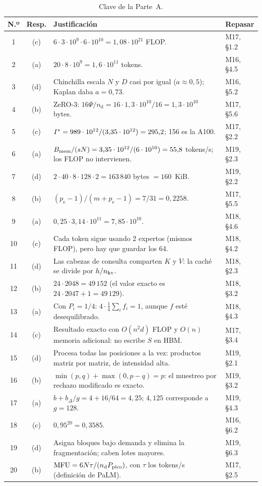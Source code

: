 \begin{table}[h]
\centering\footnotesize
\caption{Clave de la Parte~A.}\label{tab:clave}
\begin{tabularx}{\textwidth}{@{}c c >{\raggedright\arraybackslash}X l@{}}
\toprule
N.º & Resp. & Justificación & Repasar \\
\midrule
1 & (c) & $6\cdot 3\cdot 10^{9}\cdot 6\cdot 10^{10}=1{,}08\cdot 10^{21}$ FLOP. & M17, §1.2 \\
2 & (a) & $20\cdot 8\cdot 10^{9}=1{,}6\cdot 10^{11}$ tokens. & M16, §4.5 \\
3 & (d) & Chinchilla escala $N$ y $D$ casi por igual ($a\approx 0{,}5$); Kaplan daba $a=0{,}73$. & M16, §5.2 \\
4 & (b) & ZeRO-3: $16\Psi/n_{\mathrm{d}}=16\cdot 1{,}3\cdot 10^{10}/16=1{,}3\cdot 10^{10}$ bytes. & M17, §5.6 \\
5 & (c) & $I^{\ast}=989\cdot 10^{12}/(3{,}35\cdot 10^{12})=295{,}2$; 156 es la A100. & M17, §2.2 \\
6 & (a) & $B_{\mathrm{mem}}/(sN)=3{,}35\cdot 10^{12}/(6\cdot 10^{10})=55{,}8$ tokens/s; los FLOP no intervienen. & M19, §2.3 \\
7 & (d) & $2\cdot 40\cdot 8\cdot 128\cdot 2=163\,840$ bytes $=160$~KiB. & M19, §2.2 \\
8 & (b) & $(p_{\mathrm{e}}-1)/(m+p_{\mathrm{e}}-1)=7/31=0{,}2258$. & M17, §5.5 \\
9 & (a) & $0{,}25\cdot 3{,}14\cdot 10^{11}=7{,}85\cdot 10^{10}$. & M18, §4.6 \\
10 & (c) & Cada token sigue usando 2 expertos (mismos FLOP), pero hay que guardar los 64. & M18, §4.2 \\
11 & (d) & Las cabezas de consulta comparten $K$ y $V$: la caché se divide por $h/n_{\mathrm{kv}}$. & M18, §2.3 \\
12 & (b) & $24\cdot 2048=49\,152$ (el valor exacto es $24\cdot 2047+1=49\,129$). & M18, §3.2 \\
13 & (a) & Con $P_i=1/4$: $4\cdot\frac14\sum_i f_i=1$, aunque $f$ esté desequilibrado. & M18, §4.3 \\
14 & (c) & Resultado exacto con $O(n^{2}d)$ FLOP y $O(n)$ memoria adicional: no escribe $S$ en HBM. & M17, §3.4 \\
15 & (d) & Procesa todas las posiciones a la vez: productos matriz por matriz, de intensidad alta. & M19, §2.1 \\
16 & (b) & $\min(p,q)+\max(0,p-q)=p$: el muestreo por rechazo modificado es exacto. & M19, §3.2 \\
17 & (a) & $b+b_{\Delta}/g=4+16/64=4{,}25$; $4{,}125$ corresponde a $g=128$. & M19, §4.3 \\
18 & (c) & $0{,}95^{20}=0{,}3585$. & M16, §6.2 \\
19 & (d) & Asigna bloques bajo demanda y elimina la fragmentación; caben lotes mayores. & M19, §6.3 \\
20 & (b) & $\mathrm{MFU}=6N\tau/(n_{\mathrm{d}}P_{\mathrm{pico}})$, con $\tau$ los tokens/s (definición de PaLM). & M17, §2.5 \\
\bottomrule
\end{tabularx}
\end{table}

